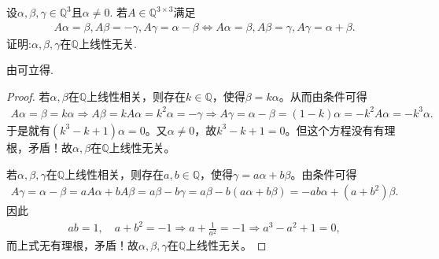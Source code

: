 \documentclass[../../main.tex]{subfiles}
\begin{document}
\begin{proposition}\label{proposition:有理数域上线性变换与向量组线性无关的命题}
设$\alpha, \beta, \gamma \in \mathbb{Q}^3$且$\alpha \neq 0$. 若$A \in \mathbb{Q}^{3 \times 3}$满足
\begin{align*}
A\alpha =\beta ,A\beta =-\gamma ,A\gamma =\alpha -\beta \Longleftrightarrow A\alpha =\beta ,A\beta =\gamma ,A\gamma =\alpha +\beta .
\end{align*}
证明:$\alpha, \beta, \gamma$在$\mathbb{Q}$上线性无关.
\end{proposition}
\begin{note}
由可立得.
\end{note}
\begin{proof}
若$\alpha, \beta$在$\mathbb{Q}$上线性相关，则存在$k\in \mathbb{Q}$，使得$\beta =k\alpha$。从而由条件可得
\begin{align*}
A\alpha =\beta =k\alpha \Longrightarrow A\beta =kA\alpha =k^2\alpha =-\gamma 
\Longrightarrow A\gamma =\alpha -\beta =\left( 1-k \right) \alpha =-k^2A\alpha =-k^3\alpha .
\end{align*}
于是就有$\left( k^3-k+1 \right) \alpha =0$。又$\alpha \ne 0$，故$k^3-k+1=0$。但这个方程没有有理根，矛盾！故$\alpha, \beta$在$\mathbb{Q}$上线性无关。

若$\alpha, \beta, \gamma$在$\mathbb{Q}$上线性相关，则存在$a,b\in \mathbb{Q}$，使得$\gamma =a\alpha +b\beta$。由条件可得
\begin{align*}
A\gamma =\alpha -\beta =aA\alpha +bA\beta =a\beta -b\gamma =a\beta -b\left( a\alpha +b\beta \right) =-ab\alpha +\left( a+b^2 \right) \beta .
\end{align*}
因此
\begin{align*}
ab=1,\quad a+b^2=-1\Longrightarrow a+\frac{1}{a^2}=-1\Longrightarrow a^3-a^2+1=0,
\end{align*}
而上式无有理根，矛盾！故$\alpha, \beta, \gamma$在$\mathbb{Q}$上线性无关。

\end{proof}
\end{document}
